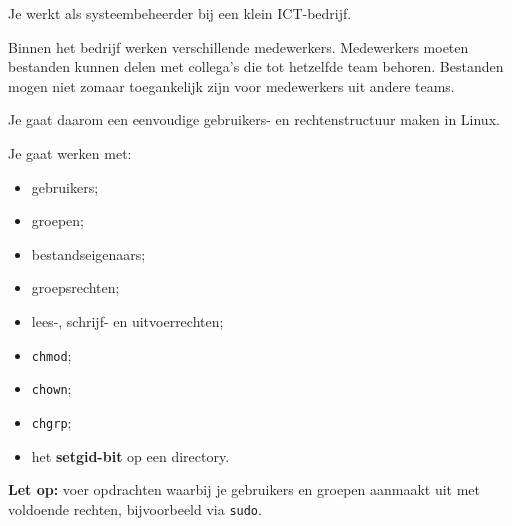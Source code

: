 Je werkt als systeembeheerder bij een klein ICT-bedrijf.

Binnen het bedrijf werken verschillende medewerkers. Medewerkers moeten bestanden kunnen delen met collega's die tot hetzelfde team behoren. Bestanden mogen niet zomaar toegankelijk zijn voor medewerkers uit andere teams.

Je gaat daarom een eenvoudige gebruikers- en rechtenstructuur maken in Linux.

Je gaat werken met:
\begin{itemize}
\item gebruikers;
\item groepen;
\item bestandseigenaars;
\item groepsrechten;
\item lees-, schrijf- en uitvoerrechten;
\item \texttt{chmod};
\item \texttt{chown};
\item \texttt{chgrp};
\item het \textbf{setgid-bit} op een directory.
\end{itemize}

\textbf{Let op:} voer opdrachten waarbij je gebruikers en groepen aanmaakt uit met voldoende rechten, bijvoorbeeld via \texttt{sudo}.

